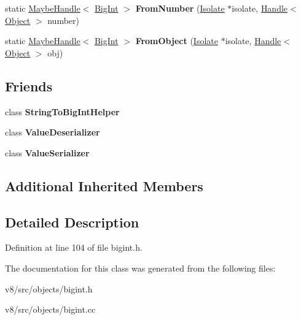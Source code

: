 \begin{DoxyCompactItemize}
static \mbox{\hyperlink{classv8_1_1internal_1_1MaybeHandle}{Maybe\+Handle}}$<$ \mbox{\hyperlink{classv8_1_1internal_1_1BigInt}{Big\+Int}} $>$ {\bfseries From\+Number} (\mbox{\hyperlink{classv8_1_1internal_1_1Isolate}{Isolate}} $\ast$isolate, \mbox{\hyperlink{classv8_1_1internal_1_1Handle}{Handle}}$<$ \mbox{\hyperlink{classv8_1_1internal_1_1Object}{Object}} $>$ number)
\item 
\mbox{\label{classv8_1_1internal_1_1BigInt_aaf6b78ba3d9b32d57042368c2512c512}} 
static \mbox{\hyperlink{classv8_1_1internal_1_1MaybeHandle}{Maybe\+Handle}}$<$ \mbox{\hyperlink{classv8_1_1internal_1_1BigInt}{Big\+Int}} $>$ {\bfseries From\+Object} (\mbox{\hyperlink{classv8_1_1internal_1_1Isolate}{Isolate}} $\ast$isolate, \mbox{\hyperlink{classv8_1_1internal_1_1Handle}{Handle}}$<$ \mbox{\hyperlink{classv8_1_1internal_1_1Object}{Object}} $>$ obj)
\end{DoxyCompactItemize}
\subsection*{Friends}
\begin{DoxyCompactItemize}
\item 
\mbox{\label{classv8_1_1internal_1_1BigInt_a824a6e9897dbc421f5f723b52794ee4f}} 
class {\bfseries String\+To\+Big\+Int\+Helper}
\item 
\mbox{\label{classv8_1_1internal_1_1BigInt_af0a555a8d5a1b2db6b416af6d4da4454}} 
class {\bfseries Value\+Deserializer}
\item 
\mbox{\label{classv8_1_1internal_1_1BigInt_a5793d9b5b7bb3d1e2e305bc9e4ac0884}} 
class {\bfseries Value\+Serializer}
\end{DoxyCompactItemize}
\subsection*{Additional Inherited Members}


\subsection{Detailed Description}


Definition at line 104 of file bigint.\+h.



The documentation for this class was generated from the following files\+:\begin{DoxyCompactItemize}
\item 
v8/src/objects/bigint.\+h\item 
v8/src/objects/bigint.\+cc\end{DoxyCompactItemize}
